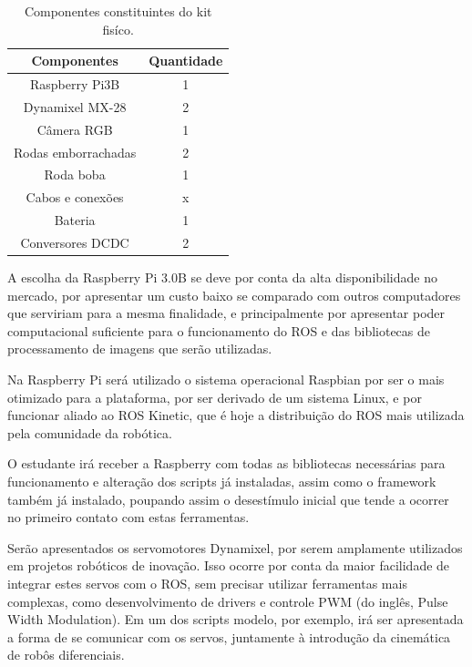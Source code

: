 \begin{table}
	\centering
	\begin{small}
		\caption{Componentes constituintes do kit fisíco.} \label{Tabela1}
		\begin{tabular}{cc}
			\hline
			Componentes              & Quantidade\\
			\hline
			Raspberry Pi3B              & 1 \\
			Dynamixel MX-28                & 2 \\
			Câmera RGB                    & 1 \\
			Rodas emborrachadas            & 2 \\
			Roda boba                    & 1 \\
			Cabos e conexões            & x \\
			Bateria                     & 1 \\
			Conversores DCDC            & 2 \\
			\hline
		\end{tabular}
	\end{small}
\end{table}
A escolha da Raspberry Pi 3.0B se deve por conta da alta disponibilidade no mercado, por apresentar um custo baixo se comparado com outros computadores que serviriam para a mesma finalidade, e principalmente por apresentar poder computacional suficiente para o funcionamento do ROS e das bibliotecas de processamento de imagens que serão utilizadas.

Na Raspberry Pi será utilizado o sistema operacional Raspbian por ser o mais otimizado para a plataforma, por ser derivado de um sistema Linux, e por funcionar
aliado ao ROS Kinetic, que é hoje a distribuição do ROS mais utilizada pela comunidade da robótica.

O estudante irá receber a Raspberry com todas as bibliotecas necessárias para funcionamento e alteração dos scripts já instaladas, assim como o framework também já instalado, poupando assim o desestímulo inicial que tende a ocorrer no primeiro contato com estas ferramentas.

Serão apresentados os servomotores Dynamixel, por serem amplamente utilizados em projetos robóticos de inovação. Isso ocorre por conta da maior facilidade de integrar estes servos com o ROS, sem precisar utilizar ferramentas mais complexas, como desenvolvimento de drivers e controle PWM (do inglês, Pulse Width Modulation). Em um dos scripts modelo, por exemplo, irá ser apresentada a forma de se comunicar com os servos, juntamente à introdução da cinemática de robôs diferenciais.


